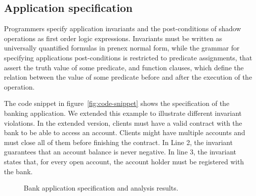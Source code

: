 \subsection{Application specification}
Programmers specify application invariants and the post-conditions
of shadow operations as
first order logic expressions.
Invariants must be written as universally quantified formulas in prenex normal
form, while the grammar for specifying applications post-conditions is
restricted to predicate assignments, that assert the truth value of some
predicate, and function clauses, which define the relation between the value of
some predicate before and after the execution of the operation.

The code snippet in figure~\ref{fig:code-snippet} shows the specification of the
banking application.
We extended this example to illustrate different invariant violations.
In the extended version, clients must have a valid contract with the bank to
be able to access an account.
Clients might have multiple accounts and must close all of them before finishing the contract.
In Line 2, the invariant guarantees that an account balance is never negative.
In line 3, the invariant states that, for every open account, the account holder must be registered with the bank.

\begin{figure}[t!]
\centering
 \begin{minipage}[b]{0.45\columnwidth}
\centering
{}
\end{minipage}
\hfill
\begin{minipage}[b]{0.53\columnwidth}
\centering
{}
\end{minipage}
\caption{Bank application specification and analysis results.}
\end{figure}

